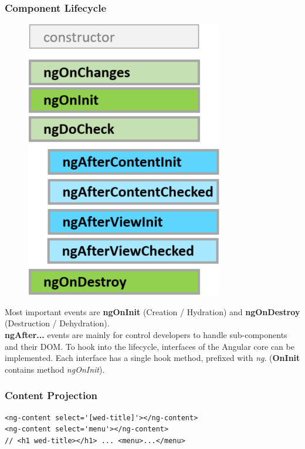 \subsubsection{Component Lifecycle}
\begingroup
\setlength{\intextsep}{0pt}
\setlength{\columnsep}{20pt}
\begin{figure}
    \centering
    \includegraphics[width=0.7\linewidth]{img/angular_component_lifecycle.png}
\end{figure}
Most important events are \textbf{ngOnInit} (Creation / Hydration) and \textbf{ngOnDestroy} (Destruction / Dehydration).\\
\textbf{ngAfter...} events are mainly for control developers to handle sub-components and their DOM.
To hook into the lifecycle, interfaces of the Angular core can be implemented.
Each interface has a single hook method, prefixed with \textit{ng}. (\textbf{OnInit} contains method \textit{ngOnInit}).\\

\endgroup


\subsubsection{Content Projection}
\begin{lstlisting}
<ng-content select='[wed-title]'></ng-content> 
<ng-content select='menu'></ng-content> 
// <h1 wed-title></h1> ... <menu>...</menu>
\end{lstlisting}

